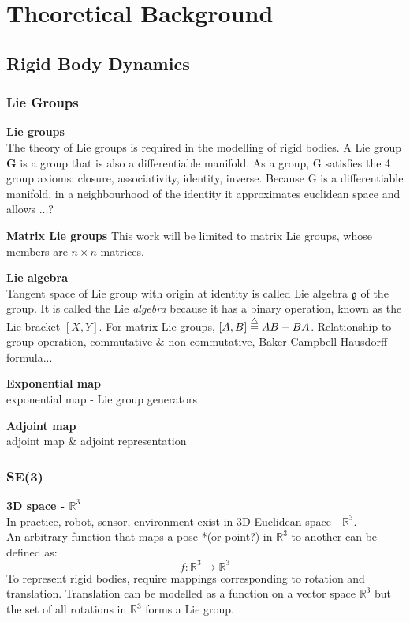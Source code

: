 \section{Theoretical Background}

\subsection{Rigid Body Dynamics}
	\subsubsection{Lie Groups}		
		\textbf{Lie groups}\\
		The theory of Lie groups is required in the modelling of rigid bodies.
		A Lie group $\mathbf{G}$ is a group that is also a differentiable manifold.
		As a group, G satisfies the 4 group axioms: closure, associativity, identity, inverse. 
		Because G is a differentiable manifold, in a neighbourhood of the identity it approximates euclidean space and allows ...?
		
		\textbf{Matrix Lie groups}
		This work will be limited to matrix Lie groups, whose members  are $n \times n$ matrices.
		
		\textbf{Lie algebra}\\
		Tangent space of Lie group with origin at identity is called Lie algebra $\mathfrak{g} $ of the group. It is called the Lie \textit{algebra} because it has a binary operation, known as the Lie bracket $[X,Y]$. For matrix Lie groups, $[A,B] \buildrel\triangle\over = AB-BA$. Relationship to group operation, commutative \& non-commutative, Baker-Campbell-Hausdorff formula...
		
		\textbf{Exponential map}\\		
		exponential map - Lie group generators
			
		\textbf{Adjoint map}\\			
		adjoint map \& adjoint representation
		
	\subsubsection{\textbf{SE}(3)}		
		\textbf{3D space - $\mathbb{R}^3$}\\
		In practice, robot, sensor, environment exist in 3D Euclidean space - $\mathbb{R}^3$.\\
		An arbitrary function that maps a pose *(or point?) in $\mathbb{R}^3$ to another can be defined as:
		\begin{equation}
		f: \mathbb{R}^3 \rightarrow \mathbb{R}^3
		\end{equation}
		To represent rigid bodies, require mappings corresponding to rotation and translation. Translation can be modelled as a function on a vector space $\mathbb{R}^3$ but the set of all rotations in $\mathbb{R}^3$ forms a Lie group.
		
